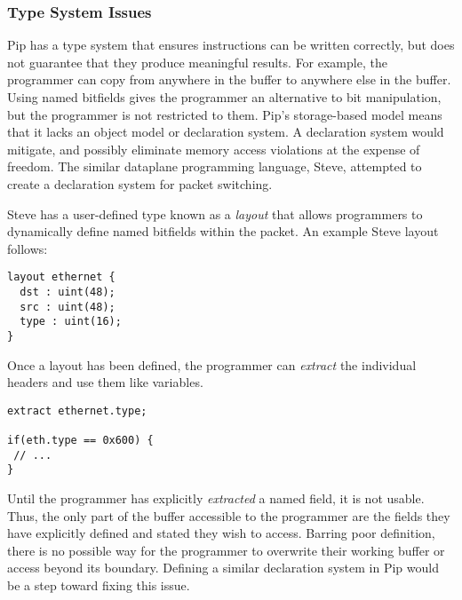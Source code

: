 \subsubsection{Type System Issues}
Pip has a type system that ensures instructions can be written correctly, but does not guarantee that they produce meaningful results. For example, the programmer can copy from anywhere in the buffer to anywhere else in the buffer. Using named bitfields gives the programmer an alternative to bit manipulation, but the programmer is not restricted to them. Pip's storage-based model means that it lacks an object model or declaration system. A declaration system would mitigate, and possibly eliminate memory access violations at the expense of freedom. The similar dataplane programming language, Steve, attempted to create a declaration system for packet switching.

Steve has a user-defined type known as a \textit{layout} that allows programmers to dynamically define named bitfields within the packet. An example Steve layout follows:
\begin{verbatim}
layout ethernet {
  dst : uint(48);
  src : uint(48);
  type : uint(16);
}
\end{verbatim}
Once a layout has been defined, the programmer can \textit{extract} the individual headers and use them like variables.
\begin{verbatim}
extract ethernet.type;

if(eth.type == 0x600) {
 // ...
}
\end{verbatim}
Until the programmer has explicitly \textit{extracted} a named field, it is not usable. Thus, the only part of the buffer accessible to the programmer are the fields they have explicitly defined and stated they wish to access. Barring poor definition, there is no possible way for the programmer to overwrite their working buffer or access beyond its boundary. Defining a similar declaration system in Pip would be a step toward fixing this issue.
